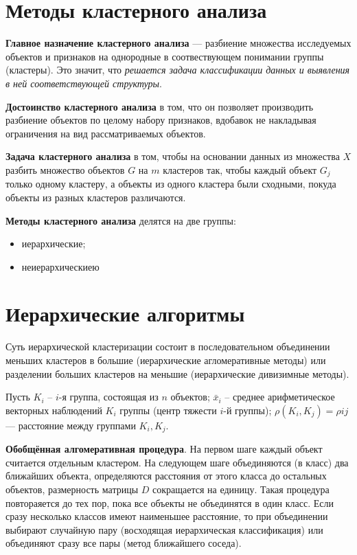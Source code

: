 \documentclass[a4paper, 12pt]{article}
\begin{document}
\tableofcontents

\newpage
\section{Методы кластерного анализа}
\textbf{Главное назначение кластерного анализа} --- разбиение множества исследуемых объектов и признаков на однородные в соотвествующем понимании группы (кластеры). Это значит, что \textit{решается задача классификации данных и выявления в ней соответствующей структуры}.

\textbf{Достоинство кластерного анализа} в том, что он позволяет производить разбиение объектов по целому набору признаков, вдобавок не накладывая ограничения на вид рассматриваемых объектов.

\textbf{Задача кластерного анализа} в том, чтобы на основании данных из множества $X$ разбить множество объектов $G$ на $m$ кластеров так, чтобы каждый объект $G_j$ только одному кластеру, а объекты из одного кластера были сходными, покуда объекты из разных кластеров различаются.

\textbf{Методы кластерного анализа} делятся на две группы:
\begin{itemize}
    \item иерархические;
    \item неиерархическиею
\end{itemize}

\section{Иерархические алгоритмы}
Суть иерархической кластеризации состоит в последовательном объединении меньших кластеров в большие (иерархические агломеративные методы) или разделении больших кластеров на меньшие (иерархические дивизимные методы).

Пусть $K_i$ -- $i$-я группа, состоящая из $n$ объектов; $\bar{x}_i$ -- среднее арифметическое векторных наблюдений $K_i$ группы (центр тяжести $i$-й группы); $\rho (K_i,K_j)=\rho{i j}$ --- расстояние между группами $K_i,K_j$.

\textbf{Обобщённая алгомеративная процедура}. На первом шаге каждый объект считается отдельным кластером. На следующем шаге объединяются (в класс) два ближайших объекта, определяются расстояния от этого класса до остальных объектов, размерность матрицы $D$ сокращается на единицу. Такая процедура повтораяется до тех пор, пока все объекты не объединятся в один класс. Если сразу несколько классов имеют наименьшее расстояние, то при объединении выбирают случайную пару (восходящая иерархическая классификация) или объединяют сразу все пары (метод ближайшего соседа).
\end{document}
